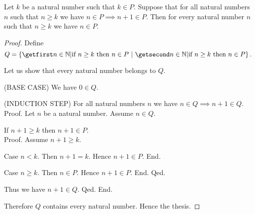 \documentclass[../../arithmetic.tex]{subfiles}
\begin{document}
  \begin{forthel}
    \begin{theorem}\label{Arithmetic_02_05_497603}
      Let $k$ be a natural number such that $k \in P$.
      Suppose that for all natural numbers $n$ such that $n \geq k$ we have $n \in P \implies n + 1 \in P$.
      Then for every natural number $n$ such that $n \geq k$ we have $n \in P$.
    \end{theorem}
    \begin{proof}
      Define \[ Q = \class{n \in \Nat | \text{if $n \geq k$ then $n \in P$}}. \]

      Let us show that every natural number belongs to $Q$.

        (BASE CASE) We have $0 \in Q$.

        (INDUCTION STEP) For all natural numbers $n$ we have $n \in Q \implies n + 1 \in Q$. \\
        Proof.
          Let $n$ be a natural number.
          Assume $n \in Q$.

          If $n + 1 \geq k$ then $n + 1 \in P$. \\
          Proof.
            Assume $n + 1 \geq k$.

            Case $n < k$.
              Then $n + 1 = k$.
              Hence $n + 1 \in P$.
            End.

            Case $n \geq k$.
              Then $n \in P$.
              Hence $n + 1 \in P$.
            End.
          Qed.

          Thus we have $n + 1 \in Q$.
        Qed.
      End.

      Therefore $Q$ contains every natural number.
      Hence the thesis.
    \end{proof}
  \end{forthel}
\end{document}
